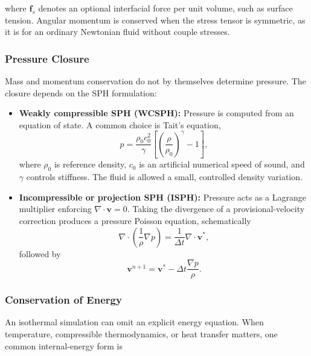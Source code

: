 \documentclass[11pt]{article}
\begin{document}
where $\mathbf{f}_{s}$ denotes an optional interfacial force per unit volume,
such as surface tension. Angular momentum is conserved when the stress tensor
is symmetric, as it is for an ordinary Newtonian fluid without couple stresses.

\subsubsection{Pressure Closure}

Mass and momentum conservation do not by themselves determine pressure.
The closure depends on the SPH formulation:

\begin{itemize}
    \item \textbf{Weakly compressible SPH (WCSPH):} Pressure is computed from
    an equation of state. A common choice is Tait's equation,
    \begin{equation}
        p = \frac{\rho_0c_0^2}{\gamma}
        \left[
        \left(\frac{\rho}{\rho_0}\right)^\gamma-1
        \right],
    \end{equation}
    where $\rho_0$ is reference density, $c_0$ is an artificial numerical
    speed of sound, and $\gamma$ controls stiffness. The fluid is allowed a
    small, controlled density variation.
    \item \textbf{Incompressible or projection SPH (ISPH):} Pressure acts as a
    Lagrange multiplier enforcing $\nabla\cdot\mathbf{v}=0$. Taking the
    divergence of a provisional-velocity correction produces a pressure
    Poisson equation, schematically
    \begin{equation}
        \nabla\cdot\left(\frac{1}{\rho}\nabla p\right)
        = \frac{1}{\Delta t}\nabla\cdot\mathbf{v}^{*},
    \end{equation}
    followed by
    \begin{equation}
        \mathbf{v}^{n+1}
        =\mathbf{v}^{*}
        -\Delta t\frac{\nabla p}{\rho}.
    \end{equation}
\end{itemize}

\subsubsection{Conservation of Energy}

An isothermal simulation can omit an explicit energy equation. When
temperature, compressible thermodynamics, or heat transfer matters, one common
internal-energy form is
\end{document}
